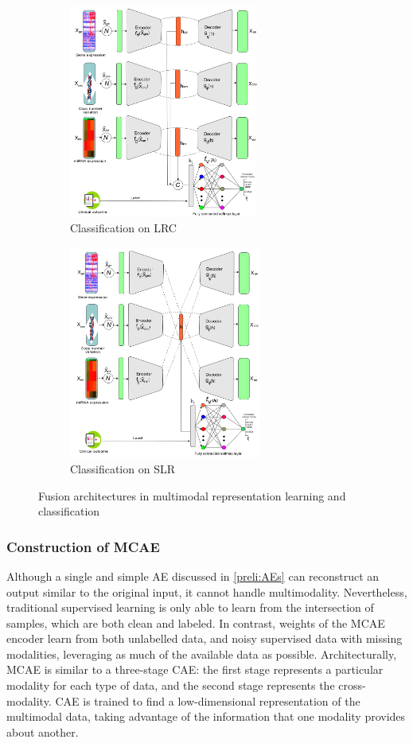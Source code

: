 \begin{figure}[htp!]
	\centering
	\begin{subfigure}{.48\linewidth}
		\centering
		\includegraphics[width=\linewidth,height=70mm]{images/lrc_cls.png}
		\caption{Classification on LRC}
        \label{fig:lrc_11}
	\end{subfigure}
	\begin{subfigure}{0.48\linewidth}
		\centering
		\includegraphics[width=\linewidth,height=70mm]{images/joint_rl_cls.png}
		\caption{Classification on SLR}
        \label{fig:slr_11}
	\end{subfigure}
	\caption{Fusion architectures in multimodal representation learning and classification} 
	\label{fig:mm_rL_example1}
\end{figure}

\subsubsection{Construction of MCAE}
Although a single and simple AE discussed in \cref{preli:AEs} can reconstruct an output similar to the original input, it cannot handle multimodality. Nevertheless, traditional supervised learning is only able to learn from the intersection of samples, which are both clean and labeled. In contrast, weights of the MCAE encoder learn from both unlabelled data, and noisy supervised data with missing modalities, leveraging as much of the available data as possible. Architecturally, MCAE is similar to a three-stage CAE: the first stage represents a particular modality for each type of data, and the second stage represents the cross-modality. CAE is trained to find a low-dimensional representation of the multimodal data, taking advantage of the information that one modality provides about another. 

